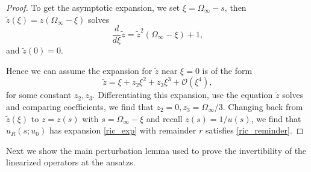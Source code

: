 \documentclass[letterpaper,11pt]{article}
\newcommand{\rmO}{\mathcal{O}}
\numberwithin{equation}{section}
\theoremstyle{plain}
\begin{document}
\begin{proof}
To get the asymptotic expansion, we set $\xi = \Omega_\infty-s$, then $\tilde{z}(\xi)=z(\Omega_\infty-\xi)$ solves
\[
\frac{d}{d\xi} \tilde{z} = \tilde{z}^2(\Omega_\infty-\xi)+1,
\]
and $\tilde{z}(0) = 0$.

Hence we can assume the expansion for $\tilde{z}$ near $\xi=0$ is of the form
\[
\tilde{z} = \xi + z_2\xi^2+z_3\xi^3 + \rmO(\xi^4),
\]
for some constant $z_2,z_3$. Differentiating this expansion, use the equation $\tilde{z}$ solves and comparing coefficients, we find that $z_2 = 0, z_3 = \Omega_\infty/3$.  Changing back from $\tilde{z}(\xi)$ to $z=z(s)$ with $s = \Omega_\infty-\xi$ and recall $z(s) = 1/u(s)$, we find that $u_R(s;u_0)$ has expansion \eqref{ric_exp} with remainder $r$ satisfies \eqref{ric_reminder}.


\end{proof}

Next we show the main perturbation lemma used to prove the invertibility of the linearized operators at the ansatzs.
\end{document}
